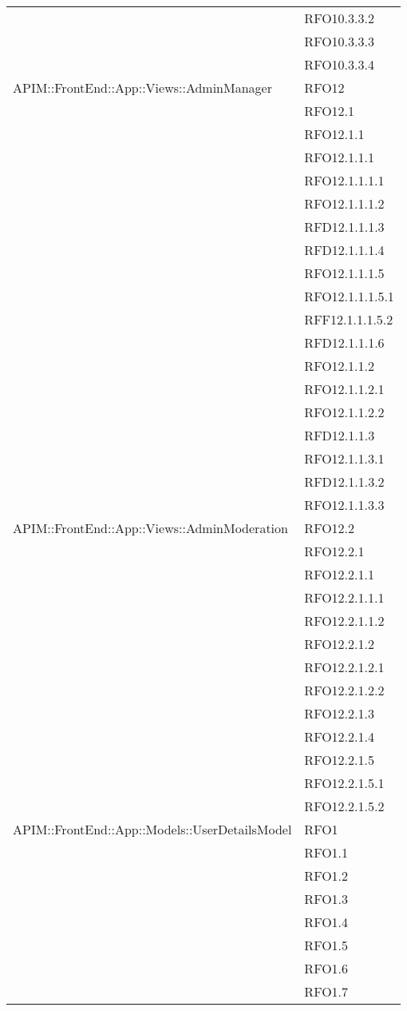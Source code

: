 \begin{longtable}{ p{12cm} | p{4cm} }
	& RFO10.3.3.2 \\
	& RFO10.3.3.3 \\
	& RFO10.3.3.4 \\
	\hline
	APIM::FrontEnd::App::Views::AdminManager
	& RFO12 \\
	& RFO12.1 \\
	& RFO12.1.1 \\
	& RFO12.1.1.1 \\
	& RFO12.1.1.1.1 \\
	& RFO12.1.1.1.2 \\
	& RFD12.1.1.1.3 \\
	& RFD12.1.1.1.4 \\
	& RFO12.1.1.1.5 \\
	& RFO12.1.1.1.5.1 \\
	& RFF12.1.1.1.5.2 \\
	& RFD12.1.1.1.6 \\
	& RFO12.1.1.2 \\
	& RFO12.1.1.2.1 \\
	& RFO12.1.1.2.2 \\
	& RFD12.1.1.3 \\
	& RFO12.1.1.3.1 \\
	& RFD12.1.1.3.2 \\
	& RFO12.1.1.3.3 \\
	\hline
	APIM::FrontEnd::App::Views::AdminModeration
	& RFO12.2 \\
	& RFO12.2.1 \\
	& RFO12.2.1.1 \\
	& RFO12.2.1.1.1 \\
	& RFO12.2.1.1.2 \\
	& RFO12.2.1.2 \\
	& RFO12.2.1.2.1 \\
	& RFO12.2.1.2.2 \\
	& RFO12.2.1.3 \\
	& RFO12.2.1.4 \\
	& RFO12.2.1.5 \\
	& RFO12.2.1.5.1 \\
	& RFO12.2.1.5.2 \\
	\hline
	APIM::FrontEnd::App::Models::UserDetailsModel
	& RFO1 \\
	& RFO1.1 \\
	& RFO1.2 \\
	& RFO1.3 \\
	& RFO1.4 \\
	& RFO1.5 \\
	& RFO1.6 \\
	& RFO1.7 \\

\end{longtable}
